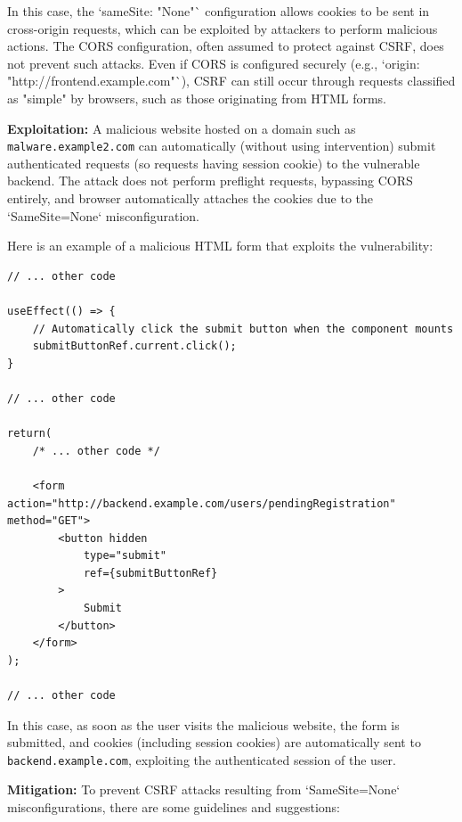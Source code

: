 \documentclass[]{article}
\begin{document}
In this case, the `sameSite: "None"` configuration allows cookies to be sent in cross-origin requests, which can be exploited by attackers to perform malicious actions. The CORS configuration, often assumed to protect against CSRF, does not prevent such attacks. Even if CORS is configured securely (e.g., `origin: "http://frontend.example.com"`), CSRF can still occur through requests classified as "simple" by browsers, such as those originating from HTML forms.

\textbf{Exploitation:}
A malicious website hosted on a domain such as \texttt{malware.example2.com} can automatically (without using intervention) submit authenticated requests (so requests having session cookie) to the vulnerable backend. The attack does not perform preflight requests, bypassing CORS entirely, and browser automatically attaches the cookies due to the `SameSite=None` misconfiguration.

Here is an example of a malicious HTML form that exploits the vulnerability:

\begin{lstlisting}
// ... other code

useEffect(() => {
    // Automatically click the submit button when the component mounts
    submitButtonRef.current.click();
}

// ... other code

return(
    /* ... other code */

    <form action="http://backend.example.com/users/pendingRegistration" method="GET">
        <button hidden
            type="submit" 
            ref={submitButtonRef}
        >
            Submit
        </button>
    </form>
);

// ... other code
\end{lstlisting}

In this case, as soon as the user visits the malicious website, the form is submitted, and cookies (including session cookies) are automatically sent to \texttt{backend.example.com}, exploiting the authenticated session of the user.

\textbf{Mitigation:}  
To prevent CSRF attacks resulting from `SameSite=None` misconfigurations, there are some guidelines and suggestions:
\end{document}
